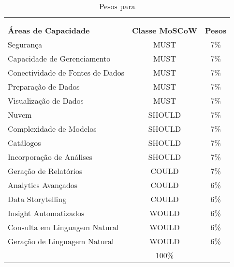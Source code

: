     \begin{table}[!h]
        \begin{center}
        \begin{tabular}{|p{}|c|c|}
            \hline
                \rowcolor{cldfB1} \multicolumn{3}{|c|}{\Large \cenGA} \\  
                \rowcolor{cldfB1}
                \multicolumn{3}{|c|}{\large \textbf{Tabela de Pesos}} \\ \hline \hline
                \rowcolor{lightgray}\textbf{Áreas de Capacidade} & \textbf{Classe MoSCoW} & \textbf{Pesos} \\ \hline
                \rowcolor{corMUST!80}Segurança & MUST & 7\% \\ \hline
                \rowcolor{corMUST!80}Capacidade de Gerenciamento & MUST & 7\% \\ \hline
                \rowcolor{corMUST!80}Conectividade de Fontes de Dados & MUST & 7\% \\ \hline
                \rowcolor{corMUST!80}Preparação de Dados & MUST & 7\% \\ \hline
                \rowcolor{corMUST!80}Visualização de Dados & MUST & 7\% \\ \hline
                \rowcolor{corSHOULD!80}Nuvem & SHOULD & 7\% \\ \hline
                \rowcolor{corSHOULD!80}Complexidade de Modelos & SHOULD & 7\% \\ \hline
                \rowcolor{corSHOULD!80}Catálogos & SHOULD & 7\% \\ \hline
                \rowcolor{corSHOULD!80}Incorporação de Análises & SHOULD & 7\% \\ \hline
                \rowcolor{corCOULD!50}Geração de Relatórios & COULD & 7\% \\ \hline
                \rowcolor{corCOULD!50}Analytics Avançados & COULD & 6\% \\ \hline
                \rowcolor{corCOULD!50}Data Storytelling & COULD & 6\% \\ \hline
                \rowcolor{corWOULD!50}Insight Automatizados & WOULD & 6\% \\ \hline
                \rowcolor{corWOULD!50}Consulta em Linguagem Natural & WOULD & 6\% \\ \hline
                \rowcolor{corWOULD!50}Geração de Linguagem Natural & WOULD & 6\% \\ \hline
                \rowcolor{lightgray!30} \multicolumn{2}{|r|}{\large Total: \normalsize} & 100\% \\ \hline 
        \end{tabular}    
        \caption{\label{tab:cenGA:pesos} Pesos para \cenGA}
        \end{center}
    \end{table}
       
